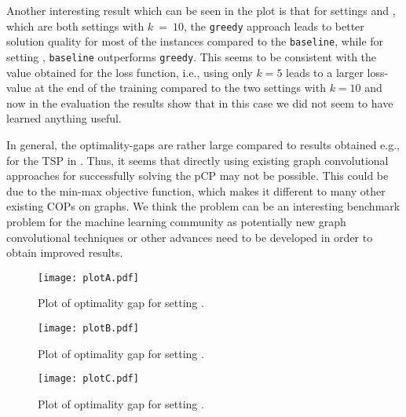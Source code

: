\documentclass[]{article}
\newcommand{\PCP}{pCP\xspace}
\begin{document}
Another interesting result which can be seen in the plot is that for settings 
\A and \C, which are both settings with $k~=~10$, the \texttt{greedy} approach 
leads to better solution quality for most of the instances compared to the 
\texttt{baseline}, while for setting \B, \texttt{baseline} outperforms 
\texttt{greedy}. This seems to be consistent with the value obtained for the 
loss function, i.e., using only $k=5$ leads to a larger loss-value at the end 
of 
the training compared to the two settings with $k=10$ and now in the evaluation 
the results show that in this case we did not seem to have learned anything 
useful.

In general, the optimality-gaps are rather large compared to results obtained 
e.g., for the TSP in \cite{joshi2019efficient,joshi2020learning}. Thus, it  
seems that directly using existing graph convolutional approaches for 
successfully solving the \PCP may not be possible. This could be due to the 
min-max objective function, which makes it different to many other existing 
COPs on graphs. We think the problem can be an interesting 
benchmark problem for the machine learning community as potentially new graph 
convolutional techniques or other advances need to be developed in order to 
obtain improved results. 

\begin{figure}[h!]
	\centering
	\texttt{[image: plotA.pdf]}
	\caption{Plot of optimality gap for setting \A.\label{fig:perfA}}
\end{figure}

\begin{figure}[h!]
		\centering
	\texttt{[image: plotB.pdf]}
	\caption{Plot of optimality gap for setting \B.\label{fig:perfB}}
\end{figure}

\begin{figure}[h!]
		\centering
	\texttt{[image: plotC.pdf]}
	\caption{Plot of optimality gap for setting \C.\label{fig:perfC}}
\end{figure}

%

\end{document}
